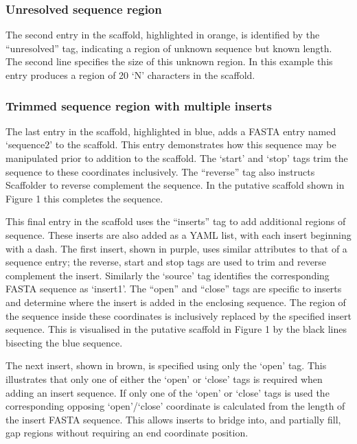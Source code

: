 \documentclass[10pt]{bmc_article}
\newenvironment{bmcformat}{\begin{raggedright}\baselineskip20pt\sloppy\setboolean{publ}{false}}{\end{raggedright}\baselineskip20pt\sloppy}
\begin{document}
\begin{bmcformat}
\subsubsection*{Unresolved sequence region} %

The second entry in the scaffold, highlighted in orange, is identified by the
``unresolved'' tag, indicating a region of unknown sequence but known length.
The second line specifies the size of this unknown region. In this example this
entry produces a region of 20 `N' characters in the scaffold. \pb

\subsubsection*{Trimmed sequence region with multiple inserts} %

The last entry in the scaffold, highlighted in blue, adds a FASTA entry named
`sequence2' to the scaffold. This entry demonstrates how this sequence may be
manipulated prior to addition to the scaffold. The `start' and `stop' tags trim
the sequence to these coordinates inclusively. The ``reverse'' tag also
instructs Scaffolder to reverse complement the sequence. In the putative
scaffold shown in Figure 1 this completes the sequence. \pb

This final entry in the scaffold uses the ``inserts'' tag to add additional
regions of sequence. These inserts are also added as a YAML list, with each
insert beginning with a dash. The first insert, shown in purple, uses similar
attributes to that of a sequence entry; the reverse, start and stop tags are
used to trim and reverse complement the insert. Similarly the `source' tag
identifies the corresponding FASTA sequence as `insert1'. The ``open'' and
``close'' tags are specific to inserts and determine where the insert is added
in the enclosing sequence. The region of the sequence inside these coordinates
is inclusively replaced by the specified insert sequence. This is visualised in
the putative scaffold in Figure 1 by the black lines bisecting the blue
sequence. \pb

The next insert, shown in brown, is specified using only the `open' tag. This
illustrates that only one of either the `open' or `close' tags is required when
adding an insert sequence. If only one of the `open' or `close' tags is used
the corresponding opposing `open'/`close' coordinate is calculated from the
length of the insert FASTA sequence. This allows inserts to bridge into, and
partially fill, gap regions without requiring an end coordinate position. \pb


\end{bmcformat}
\end{document}
